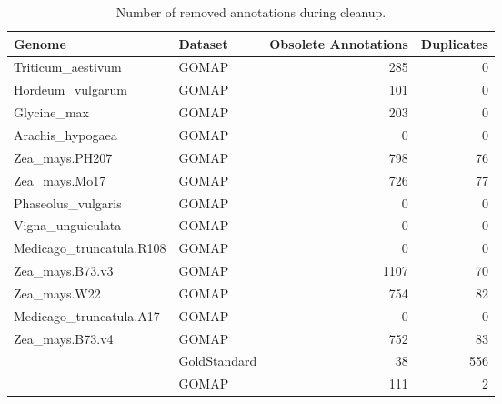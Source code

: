 \documentclass[]{article}
\begin{document}
\begin{table}[t]

\caption{\label{tab:cleanup_table}Number of removed annotations during cleanup.}
\centering
\begin{tabular}{llrr}
\toprule
Genome & Dataset & Obsolete Annotations & Duplicates\\
\midrule
\rowcolor{gray!6}  Triticum\_aestivum & GOMAP & 285 & 0\\
\cmidrule{1-4}
Hordeum\_vulgarum & GOMAP & 101 & 0\\
\cmidrule{1-4}
\rowcolor{gray!6}  Glycine\_max & GOMAP & 203 & 0\\
\cmidrule{1-4}
Arachis\_hypogaea & GOMAP & 0 & 0\\
\cmidrule{1-4}
\rowcolor{gray!6}  Zea\_mays.PH207 & GOMAP & 798 & 76\\
\cmidrule{1-4}
Zea\_mays.Mo17 & GOMAP & 726 & 77\\
\cmidrule{1-4}
\rowcolor{gray!6}  Phaseolus\_vulgaris & GOMAP & 0 & 0\\
\cmidrule{1-4}
Vigna\_unguiculata & GOMAP & 0 & 0\\
\cmidrule{1-4}
\rowcolor{gray!6}  Medicago\_truncatula.R108 & GOMAP & 0 & 0\\
\cmidrule{1-4}
Zea\_mays.B73.v3 & GOMAP & 1107 & 70\\
\cmidrule{1-4}
\rowcolor{gray!6}  Zea\_mays.W22 & GOMAP & 754 & 82\\
\cmidrule{1-4}
Medicago\_truncatula.A17 & GOMAP & 0 & 0\\
\cmidrule{1-4}
\rowcolor{gray!6}  Zea\_mays.B73.v4 & GOMAP & 752 & 83\\
\cmidrule{1-4}
 & GoldStandard & 38 & 556\\

\rowcolor{gray!6}  \multirow{-2}{*}{\raggedright\arraybackslash Oryza\_sativa} & GOMAP & 111 & 2\\
\bottomrule
\end{tabular}
\end{table}
\end{document}
